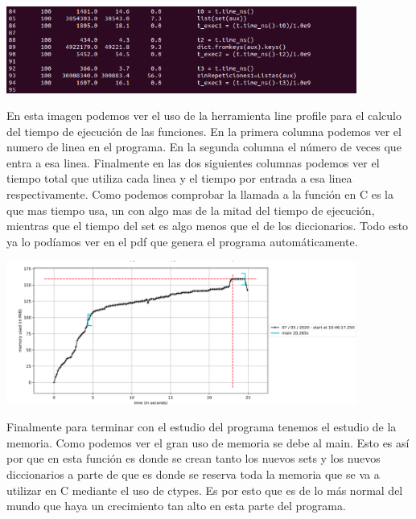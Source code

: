 \documentclass{article}
\begin{document}
\includegraphics[width=11.5cm]{Line_profile.PNG}

En esta imagen podemos ver el uso de la herramienta line profile para el calculo del tiempo de ejecución de las funciones. En la primera columna podemos ver el numero de linea en el programa. En la segunda columna el número de veces que entra a esa linea. Finalmente en las dos siguientes columnas podemos ver el tiempo total que utiliza cada linea y el tiempo por entrada a esa linea respectivamente. Como podemos comprobar la llamada a la función en C es la que mas tiempo usa, un con algo mas de la mitad del tiempo de ejecución, mientras que el tiempo del set es algo menos que el de los diccionarios. Todo esto ya lo podíamos ver en el pdf que genera el programa automáticamente.

\includegraphics[width=11.5cm]{memory_profile.PNG}

Finalmente para terminar con el estudio del programa tenemos el estudio de la memoria. Como podemos ver el gran uso de memoria se debe al main. Esto es así por que en esta función es donde se crean tanto los nuevos sets y los nuevos diccionarios a parte de que es donde se reserva toda la memoria que se va a utilizar en C mediante el uso de ctypes. Es por esto que es de lo más normal del mundo que haya un crecimiento tan alto en esta parte del programa.
\end{document}

